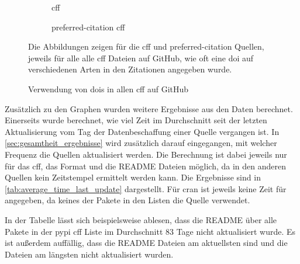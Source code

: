 \begin{figure}
    \begin{subfigure}{.5\textwidth}
        \centering
        
        \caption{\gls{cff}}
        \label{fig:full_cff_doi}
    \end{subfigure}%
    \begin{subfigure}{.5\textwidth}
        \centering
        
        \caption{\glqq preferred-citation\grqq{} \gls{cff}}
        \label{fig:full_preferred_citation_doi}
    \end{subfigure}
    \caption{Verwendung von \gls{doi}s in allen \gls{cff} auf GitHub}
    \label{fig:full_doi}
    \small
    \raggedright
    Die Abbildungen zeigen für die \gls{cff} und \glqq preferred-citation\grqq{} Quellen, jeweils für alle alle \gls{cff} Dateien auf GitHub, wie oft eine \gls{doi} auf verschiedenen Arten in den Zitationen angegeben wurde.
\end{figure}

Zusätzlich zu den Graphen wurden weitere Ergebnisse aus den Daten berechnet.
Einerseits wurde berechnet, wie viel Zeit im Durchschnitt seit der letzten Aktualisierung vom Tag der Datenbeschaffung einer Quelle vergangen ist.
In \autoref{sec:gesamtheit_ergebnisse} wird zusätzlich darauf eingegangen, mit welcher Frequenz die Quellen aktualisiert werden.
Die Berechnung ist dabei jeweils nur für das \gls{cff}, das  Format und die README Dateien möglich, da in den anderen Quellen kein Zeitstempel ermittelt werden kann.
Die Ergebnisse sind in \autoref{tab:average_time_last_update} dargestellt.
Für \gls{cran} ist jeweils keine Zeit für  angegeben, da keines der Pakete in den Listen die Quelle verwendet.

In der Tabelle lässt sich beispielsweise ablesen, dass die README über alle Pakete in der \gls{pypi} \gls{cff} Liste im Durchschnitt 83 Tage nicht aktualisiert wurde.
Es ist außerdem auffällig, dass die README Dateien am aktuellsten sind und die  Dateien am längsten nicht aktualisiert wurden.


